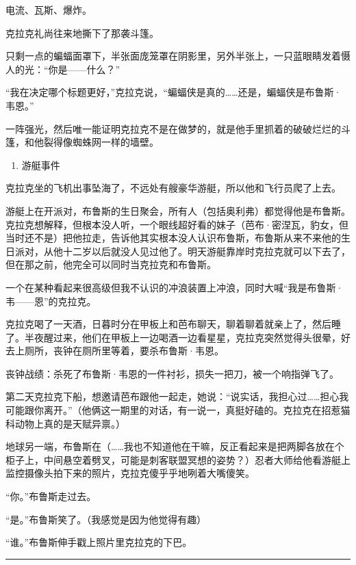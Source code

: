 \documentclass[../main]{subfiles}
\begin{document}
电流、瓦斯、爆炸。

克拉克礼尚往来地撕下了那袭斗篷。

只剩一点的蝙蝠面罩下，半张面庞笼罩在阴影里，另外半张上，一只蓝眼睛发着慑人的光：“你是——什么？”

“我在决定哪个标题更好，”克拉克说，“蝙蝠侠是真的……还是，蝙蝠侠是布鲁斯·韦恩。”

一阵强光，然后唯一能证明克拉克不是在做梦的，就是他手里抓着的破破烂烂的斗篷，和他裂得像蜘蛛网一样的墙壁。

\begin{enumerate}
    \def\labelenumi{\arabic{enumi}.}
    \item
          游艇事件
\end{enumerate}

克拉克坐的飞机出事坠海了，不远处有艘豪华游艇，所以他和飞行员爬了上去。

游艇上在开派对，布鲁斯的生日聚会，所有人（包括奥利弗）都觉得他是布鲁斯。克拉克想解释，但根本没人听，一个眼线超好看的妹子（芭布·密涅瓦，豹女，但当时还不是）把他拉走，告诉他其实根本没人认识布鲁斯，布鲁斯从来不来他的生日派对，从他十二岁以后就没人见过他了。明天游艇靠岸时克拉克就可以下去了，但在那之前，他完全可以同时当克拉克和布鲁斯。

一个在某种看起来很高级但我不认识的冲浪装置上冲浪，同时大喊“我是布鲁斯·韦——恩”的克拉克。

克拉克喝了一天酒，日暮时分在甲板上和芭布聊天，聊着聊着就亲上了，然后睡了。半夜醒过来，他们在甲板上一边喝酒一边看星星，克拉克突然觉得头很晕，好去上厕所，丧钟在厕所里等着，要杀布鲁斯·韦恩。

丧钟战绩：杀死了布鲁斯·韦恩的一件衬衫，损失一把刀，被一个响指弹飞了。

第二天克拉克下船，想邀请芭布跟他一起走，她说：“说实话，我担心过……担心我可能跟你离开。”（他俩这一期里的对话，有一说一，真挺好磕的。克拉克在招惹猫科动物上真的是天赋异禀。）

地球另一端，布鲁斯在（……我也不知道他在干嘛，反正看起来是把两脚各放在个柜子上，中间悬空着劈叉，可能是刺客联盟冥想的姿势？）忍者大师给他看游艇上监控摄像头拍下来的照片，克拉克傻乎乎地咧着大嘴傻笑。

“你。”布鲁斯走过去。

“是。”布鲁斯笑了。（我感觉是因为他觉得有趣）

“谁。”布鲁斯伸手戳上照片里克拉克的下巴。

\begin{center}\rule{0.5\linewidth}{0.5pt}\end{center}
\end{document}
